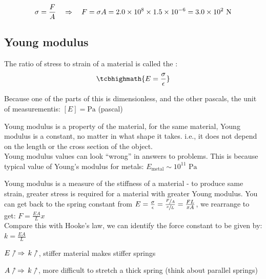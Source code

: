
\begin{soln}
    
\begin{equation*}
\sigma = \frac{F}{A} \quad \Rightarrow \quad F = \sigma A = 2.0 \times 10^8 \times 1.5 \times 10^{-6} = 3.0 \times 10^2 \text{ N} 
\end{equation*}
\end{soln}

\subsection{Young modulus}

\begin{ilight}
	\centering The ratio of stress to strain of a material is called the :\begin{equation*} 
 \tcbhighmath{E = \frac{\sigma}{\epsilon}} \end{equation*}
\end{ilight}


Because one of the parts of this is dimensionless, and the other pascals, the unit of measurementis: $[E] = \text{Pa}$ (pascal)

Young modulus is a property of the material, for the same material, Young modulus is a constant, no matter in what shape it takes. i.e., it does not depend on the length or the cross section of the object.\\
Young modulus values can look ``wrong'' in answers to problems. This is because typical value of Young's modulus for metals: $E_\text{metal} \sim 10^{11} \text{ Pa}$

Young modulus is a measure of the stiffness of a material - to produce same strain, greater stress is required for a material with greater Young modulus. You can get back to the spring constant from $E = \frac{\sigma}{\epsilon} = \frac{\sfrac{F}{A}}{\sfrac{x}{L}} = \frac{FL}{xA}$, we rearrange to get: $F = \frac{EA}{L}x$\\

Compare this with Hooke's law, we can identify the force constant to be given by: $k = \frac{EA}{L} $

\titem $E \nnearrow \, \Rightarrow \, k \nnearrow$, stiffer material makes stiffer springs

\titem $A \nnearrow \, \Rightarrow \, k \nnearrow$, more difficult to stretch a thick spring (think about parallel springs)

